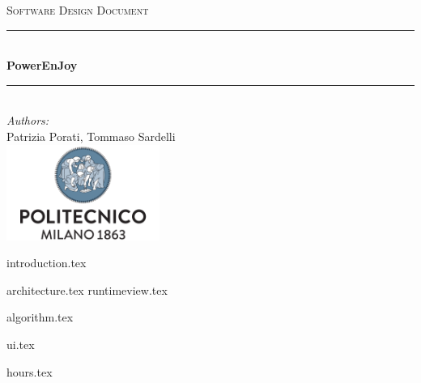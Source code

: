 \documentclass[a4paper,11pt]{article}
\begin{document}
\begin{titlepage}
\begin{center}
\textsc{\LARGE Software Design Document}\\[1.5cm] %

\rule{\linewidth}{0.5mm} \\[0.7cm]
{\huge \bfseries PowerEnJoy}\\[0.4cm] %
\rule{\linewidth}{0.5mm} \\[1.5cm]

\emph{Authors:}\\
Patrizia Porati, Tommaso Sardelli\\[2.0cm]

\vfill
\vfill
\includegraphics[width=50mm]{polimi.png}\\
\end{center}
\end{titlepage}

\tableofcontents
\pagebreak

{introduction.tex}

{architecture.tex}
{runtimeview.tex}

{algorithm.tex}

{ui.tex}


{hours.tex}


\end{document}
